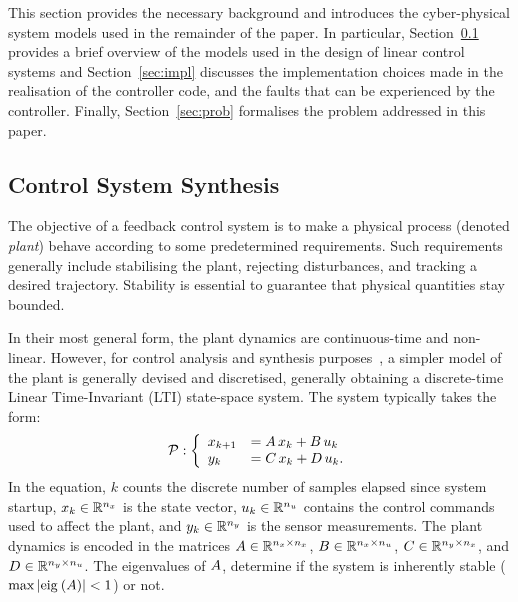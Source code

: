 %
This section provides the necessary background and introduces the cyber-physical system models used in the remainder of the paper.
In particular, Section~\ref{sec:control} provides a brief overview of the models used in the design of linear control systems and Section~\ref{sec:impl} discusses the implementation choices made in the realisation of the controller code, and the faults that can be experienced by the controller.
Finally, Section~\ref{sec:prob} formalises the problem addressed in this paper.

\subsection{Control System Synthesis}%
\label{sec:control}%
%
The objective of a feedback control system is to make a physical process (denoted \emph{plant}) behave according to some predetermined requirements.
Such requirements generally include stabilising the plant, rejecting disturbances, and tracking a desired trajectory.
Stability is essential to guarantee that physical quantities stay bounded.

In their most general form, the plant dynamics are continuous-time and non-linear.
However, for control analysis and synthesis purposes~\cite{Astrom:1997}, a simpler model of the plant is generally devised and discretised, generally obtaining a discrete-time Linear Time-Invariant (LTI) state-space system.
The system typically takes the form:
%
\begin{equation}
    \label{eq:plant} 
    \plant: \left\{\begin{array}{ll}
        x_{k+1} &= \Ap\,x_k+\Bp\,u_k\\
        y_k     &= \Cp\,x_k+\Dp\,u_k.
    \end{array}\right.
\end{equation}
%
In the equation, $k$ counts the discrete number of samples elapsed since system startup, $x_k \in \mathbb{R}^{n_x}$ is the state vector, $u_k \in \mathbb{R}^{n_u}$ contains the control commands used to affect the plant, and $y_k \in \mathbb{R}^{n_y}$ is the sensor measurements.
The plant dynamics is encoded in the matrices $A \in \mathbb{R}^{n_x \times n_x}$, $B \in \mathbb{R}^{n_x \times n_u}$, $C \in \mathbb{R}^{n_y \times n_x}$, and $D \in \mathbb{R}^{n_y \times n_u}$.
The eigenvalues of $A$, determine if the system is inherently stable ($\max{\left|\mathrm{eig}_{}\left( A\right)\right|} < 1$) or not.

